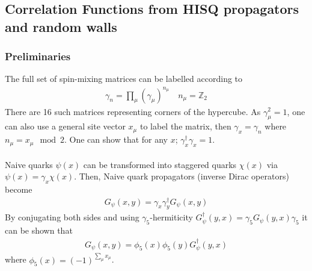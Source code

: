 \subsection{Correlation Functions from HISQ propagators and random walls}

\subsubsection{Preliminaries}
The full set of spin-mixing matrices can be labelled according to
\begin{align}
	\gamma_n = \prod_{\mu} \left( \gamma_{\mu} \right)^{n_{\mu}} \quad n_{\mu} = \mathbb{Z}_2
\end{align}
There are 16 such matrices representing corners of the hypercube. As $\gamma_{\mu}^2=1$, one can also use a general site vector $x_{\mu}$ to label the matrix, then $\gamma_x = \gamma_n$ where $n_{\mu} = x_{\mu} \mod 2$. One can show that for any $x$; $\gamma_x^{\dagger} \gamma_x = 1$.
\\ \\
Naive quarks $\psi(x)$ can be transformed into staggered quarks $\chi(x)$ via $\psi(x) = \gamma_x \chi(x)$. Then, Naive quark propagators (inverse Dirac operators) become
\begin{align}
	G_{\psi}(x,y) = \gamma_x\gamma^{\dagger}_y G_{\psi}(x,y)
\end{align}
By conjugating both sides and using $\gamma_5$-hermiticity $G^{\dagger}_{\psi}(y,x) = \gamma_5 G_{\psi}(y,x)\gamma_5$ it can be shown that
\begin{align}
	\label{eq:Gconj}
	G_{\psi}(x,y) = \phi_5(x)\phi_5(y) G^{\dagger}_{\psi}(y,x)
\end{align}
where $\phi_5(x) = (-1)^{\sum_{\mu} x_{\mu}}$.

